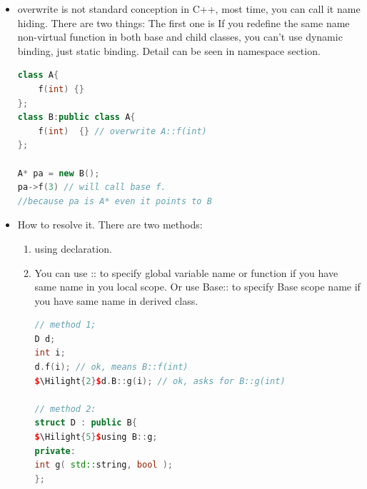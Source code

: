 \documentclass[a4paper,12pt,twoside]{book}
\newcommand{\Hilight}[1]{\makebox[0pt][l]{\color{yellow}\rule[-3pt]{#1em}{11pt}}}
\begin{document}
\begin{itemize}
\begin{enumerate}
\end{enumerate}

\item overwrite is not standard conception in C++, most time, you can call it name hiding. There are two things: The first one is If you redefine the same name non-virtual function in both base and child classes, you can't use dynamic binding, just static binding.  Detail can be seen in namespace section.
\begin{lstlisting}[frame=single, language=c++]
class A{
    f(int) {}
};
class B:public class A{
    f(int)  {} // overwrite A::f(int)
};

A* pa = new B();
pa->f(3) // will call base f.
//because pa is A* even it points to B
\end{lstlisting}


\item How to resolve it.  There are two methods:
\begin{enumerate}
\item using declaration.

\item You can use :: to specify global variable name or function if you have same name in you local scope.  Or use Base:: to specify Base scope name if you have same name in derived class.
\begin{lstlisting}[frame=single, language=c++, mathescape=true]
// method 1;
D d;
int i;
d.f(i); // ok, means B::f(int)
$\Hilight{2}$d.B::g(i); // ok, asks for B::g(int)

// method 2:
struct D : public B{
$\Hilight{5}$using B::g;
private:
int g( std::string, bool );
};
\end{lstlisting}

\end{enumerate}
\end{itemize}
\end{document}
